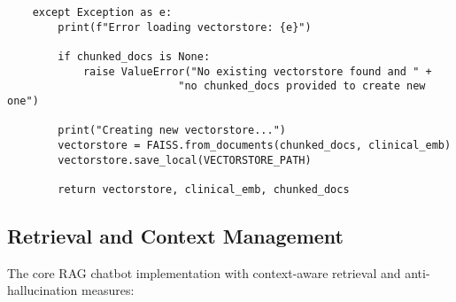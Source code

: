 \begin{verbatim}
    except Exception as e:
        print(f"Error loading vectorstore: {e}")
        
        if chunked_docs is None:
            raise ValueError("No existing vectorstore found and " +
                           "no chunked_docs provided to create new one")
        
        print("Creating new vectorstore...")
        vectorstore = FAISS.from_documents(chunked_docs, clinical_emb)
        vectorstore.save_local(VECTORSTORE_PATH)
        
        return vectorstore, clinical_emb, chunked_docs
\end{verbatim}

\subsection{Retrieval and Context Management}

The core RAG chatbot implementation with context-aware retrieval and anti-hallucination measures:

